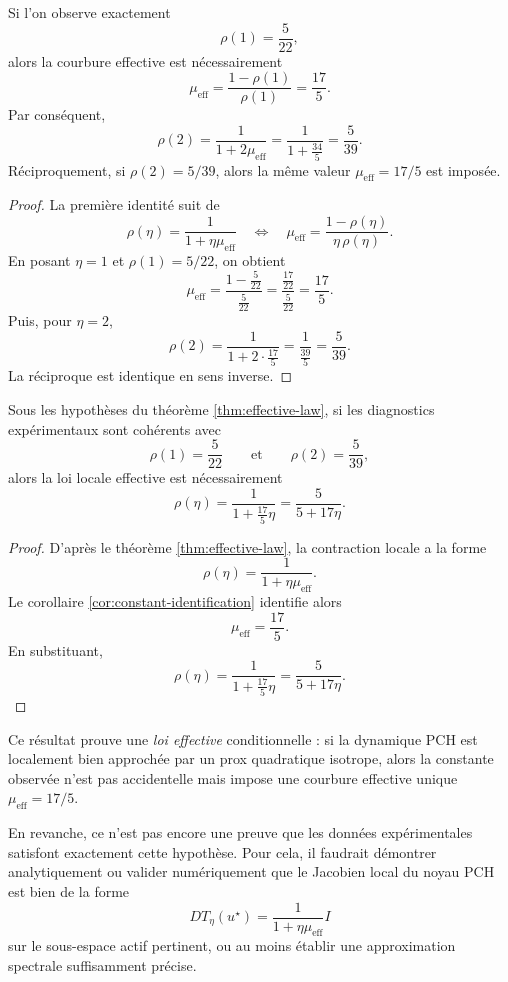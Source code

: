 \begin{corollary}
\label{cor:constant-identification}
Si l'on observe exactement
\[
\rho(1)=\frac{5}{22},
\]
alors la courbure effective est nécessairement
\[
\mu_{\mathrm{eff}}
=
\frac{1-\rho(1)}{\rho(1)}
=
\frac{17}{5}.
\]
Par conséquent,
\[
\rho(2)
=
\frac{1}{1+2\mu_{\mathrm{eff}}}
=
\frac{1}{1+\frac{34}{5}}
=
\frac{5}{39}.
\]
Réciproquement, si $\rho(2)=5/39$, alors la même valeur $\mu_{\mathrm{eff}}=17/5$ est imposée.
\end{corollary}

\begin{proof}
La première identité suit de
\[
\rho(\eta)=\frac{1}{1+\eta\mu_{\mathrm{eff}}}
\quad\Longleftrightarrow\quad
\mu_{\mathrm{eff}}
=
\frac{1-\rho(\eta)}{\eta\,\rho(\eta)}.
\]
En posant $\eta=1$ et $\rho(1)=5/22$, on obtient
\[
\mu_{\mathrm{eff}}
=
\frac{1-\frac{5}{22}}{\frac{5}{22}}
=
\frac{\frac{17}{22}}{\frac{5}{22}}
=
\frac{17}{5}.
\]
Puis, pour $\eta=2$,
\[
\rho(2)
=
\frac{1}{1+2\cdot \frac{17}{5}}
=
\frac{1}{\frac{39}{5}}
=
\frac{5}{39}.
\]
La réciproque est identique en sens inverse.
\end{proof}

\begin{proposition}
\label{prop:closed-law}
Sous les hypothèses du théorème \ref{thm:effective-law}, si les diagnostics expérimentaux sont cohérents avec
\[
\rho(1)=\frac{5}{22}
\qquad\text{et}\qquad
\rho(2)=\frac{5}{39},
\]
alors la loi locale effective est nécessairement
\[
\rho(\eta)=\frac{1}{1+\frac{17}{5}\eta}
=
\frac{5}{5+17\eta}.
\]
\end{proposition}

\begin{proof}
D'après le théorème \ref{thm:effective-law}, la contraction locale a la forme
\[
\rho(\eta)=\frac{1}{1+\eta\mu_{\mathrm{eff}}}.
\]
Le corollaire \ref{cor:constant-identification} identifie alors
\[
\mu_{\mathrm{eff}}=\frac{17}{5}.
\]
En substituant,
\[
\rho(\eta)=\frac{1}{1+\frac{17}{5}\eta}
=
\frac{5}{5+17\eta}.
\]
\end{proof}

\begin{remark}
Ce résultat prouve une \emph{loi effective} conditionnelle : si la dynamique PCH est localement bien approchée par un prox quadratique isotrope, alors la constante observée n'est pas accidentelle mais impose une courbure effective unique $\mu_{\mathrm{eff}}=17/5$.

En revanche, ce n'est pas encore une preuve que les données expérimentales satisfont exactement cette hypothèse. Pour cela, il faudrait démontrer analytiquement ou valider numériquement que le Jacobien local du noyau PCH est bien de la forme
\[
D T_\eta(u^\star)=\frac{1}{1+\eta\mu_{\mathrm{eff}}}I
\]
sur le sous-espace actif pertinent, ou au moins établir une approximation spectrale suffisamment précise.
\end{remark}




